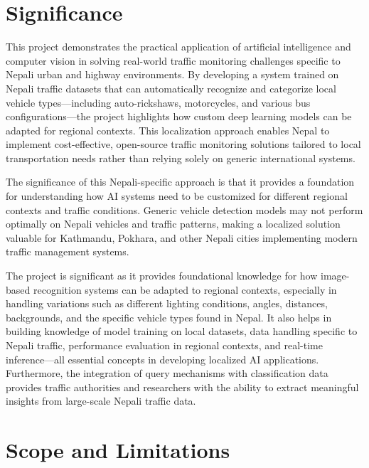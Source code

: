 \documentclass[12pt,a4paper]{report}
\begin{document}
\section{Significance}

This project demonstrates the practical application of artificial intelligence and computer vision in solving real-world traffic monitoring challenges specific to Nepali urban and highway environments. By developing a system trained on Nepali traffic datasets that can automatically recognize and categorize local vehicle types—including auto-rickshaws, motorcycles, and various bus configurations—the project highlights how custom deep learning models can be adapted for regional contexts. This localization approach enables Nepal to implement cost-effective, open-source traffic monitoring solutions tailored to local transportation needs rather than relying solely on generic international systems.

The significance of this Nepali-specific approach is that it provides a foundation for understanding how AI systems need to be customized for different regional contexts and traffic conditions. Generic vehicle detection models may not perform optimally on Nepali vehicles and traffic patterns, making a localized solution valuable for Kathmandu, Pokhara, and other Nepali cities implementing modern traffic management systems.

The project is significant as it provides foundational knowledge for how image-based recognition systems can be adapted to regional contexts, especially in handling variations such as different lighting conditions, angles, distances, backgrounds, and the specific vehicle types found in Nepal. It also helps in building knowledge of model training on local datasets, data handling specific to Nepali traffic, performance evaluation in regional contexts, and real-time inference—all essential concepts in developing localized AI applications. Furthermore, the integration of query mechanisms with classification data provides traffic authorities and researchers with the ability to extract meaningful insights from large-scale Nepali traffic data.

\section{Scope and Limitations}
\end{document}
